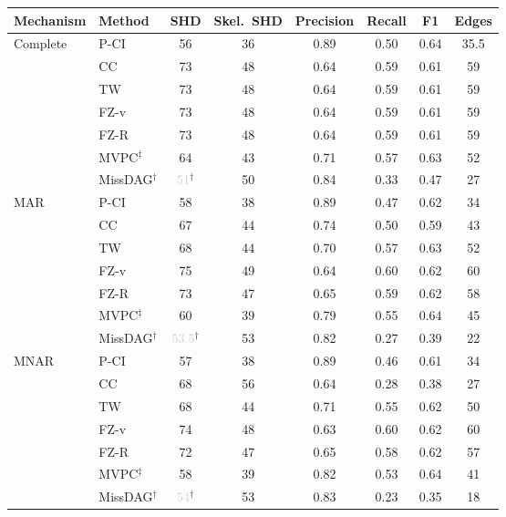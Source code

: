 \begin{tabular}{llcccccc}
    \toprule
    Mechanism & Method & SHD & Skel.\ SHD & Precision & Recall & F1 & Edges \\
    \midrule
    Complete  & P-CI               & 56 & 36 & 0.89 & 0.50 & 0.64 & 35.5 \\
              & CC                 & 73 & 48 & 0.64 & 0.59 & 0.61 & 59 \\
              & TW                 & 73 & 48 & 0.64 & 0.59 & 0.61 & 59 \\
              & FZ-v               & 73 & 48 & 0.64 & 0.59 & 0.61 & 59 \\
              & FZ-R               & 73 & 48 & 0.64 & 0.59 & 0.61 & 59 \\
              & MVPC$^\ddagger$    & 64 & 43 & 0.71 & 0.57 & 0.63 & 52 \\
              & MissDAG$^\dagger$  & \textcolor{lightgray}{51}$^\dagger$ & 50 & 0.84 & 0.33 & 0.47 & 27 \\
    \midrule
    MAR       & P-CI               & 58 & 38 & 0.89 & 0.47 & 0.62 & 34 \\
              & CC                 & 67 & 44 & 0.74 & 0.50 & 0.59 & 43 \\
              & TW                 & 68 & 44 & 0.70 & 0.57 & 0.63 & 52 \\
              & FZ-v               & 75 & 49 & 0.64 & 0.60 & 0.62 & 60 \\
              & FZ-R               & 73 & 47 & 0.65 & 0.59 & 0.62 & 58 \\
              & MVPC$^\ddagger$    & 60 & 39 & 0.79 & 0.55 & 0.64 & 45 \\
              & MissDAG$^\dagger$  & \textcolor{lightgray}{53.5}$^\dagger$ & 53 & 0.82 & 0.27 & 0.39 & 22 \\
    \midrule
    MNAR      & P-CI               & 57 & 38 & 0.89 & 0.46 & 0.61 & 34 \\
              & CC                 & 68 & 56 & 0.64 & 0.28 & 0.38 & 27 \\
              & TW                 & 68 & 44 & 0.71 & 0.55 & 0.62 & 50 \\
              & FZ-v               & 74 & 48 & 0.63 & 0.60 & 0.62 & 60 \\
              & FZ-R               & 72 & 47 & 0.65 & 0.58 & 0.62 & 57 \\
              & MVPC$^\ddagger$    & 58 & 39 & 0.82 & 0.53 & 0.64 & 41 \\
              & MissDAG$^\dagger$  & \textcolor{lightgray}{54}$^\dagger$ & 53 & 0.83 & 0.23 & 0.35 & 18 \\

\end{tabular}
